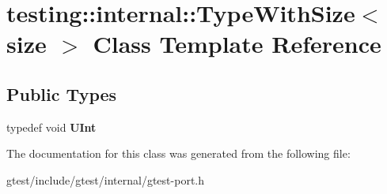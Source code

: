 \hypertarget{classtesting_1_1internal_1_1TypeWithSize}{}\section{testing\+:\+:internal\+:\+:Type\+With\+Size$<$ size $>$ Class Template Reference}
\label{classtesting_1_1internal_1_1TypeWithSize}
\subsection*{Public Types}
\begin{DoxyCompactItemize}
\item 
\mbox{\label{classtesting_1_1internal_1_1TypeWithSize_a3898640d9f6c1e18110eef90f47a5d7b}} 
typedef void {\bfseries U\+Int}
\end{DoxyCompactItemize}


The documentation for this class was generated from the following file\+:\begin{DoxyCompactItemize}
\item 
gtest/include/gtest/internal/gtest-\/port.\+h\end{DoxyCompactItemize}
